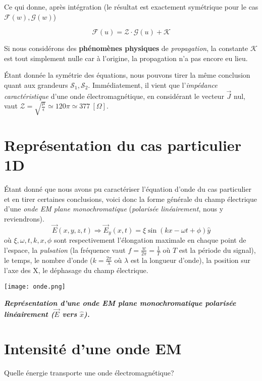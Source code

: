 Ce qui donne, après intégration (le résultat est exactement symétrique pour le cas $\mathcal{F}(w), \mathcal{G}(w)$) 

\[\mathcal{F}(u) = \mathcal{Z} \cdot \mathcal{G}(u) + \mathcal{K}\]

Si nous considérons des \textbf{phénomènes physiques} de \textit{propagation}, la constante $\mathcal{K}$ est tout simplement nulle car 
à l'origine, la propagation n'a pas encore eu lieu. 


Étant donnée la symétrie des équations, nous pouvons tirer la même conclusion quant aux grandeurs $\mathcal{S}_{1},\mathcal{S}_{2}$. 
Immédiatement, il vient que l'\textit{impédance caractéristique} d'une onde électromagnétique, en considérant le vecteur $\vec{J}$ nul, vaut 
$\mathcal{Z} = \sqrt{\frac{\mu}{\epsilon}} \simeq120 \pi \simeq \SI{377}{[\Omega]} $. 

\section{Représentation du cas particulier 1D}

Étant donné que nous avons pu caractériser l'équation d'onde du cas particulier et en tirer certaines conclusions, 
voici donc la forme générale du champ électrique d'une \textit{onde EM plane monochromatique} (\textit{polarisée linéairement}, nous y reviendrons).
\[\vec{E}(x,y,z,t) \Rightarrow \vec{E}_{y}(x,t) = \xi \sin(k x - \omega t + \phi) \hat{y} \]
où $\xi,\omega,t,k,x,\phi$ sont respectivement l'élongation maximale en chaque point de l'espace, la \textit{pulsation} (la fréquence  vaut $f = \frac{w}{2 \pi} = \frac{1}{T}$ où $T$ 
est la période du signal), le temps, le nombre d'onde ($k = \frac{2\pi}{\lambda}$ où $\lambda$ est la longueur d'onde), la position sur l'axe des X, le déphasage  du champ électrique. 
\begin{marginfigure}
\texttt{[image: onde.png]}
\caption{\textit{\textbf{Représentation d'une onde EM plane monochromatique polarisée linéairement ($\vec{E}$ vers $\hat{x}$).}}}
\end{marginfigure}

\section{Intensité d'une onde EM}  %

Quelle énergie transporte une onde électromagnétique?

